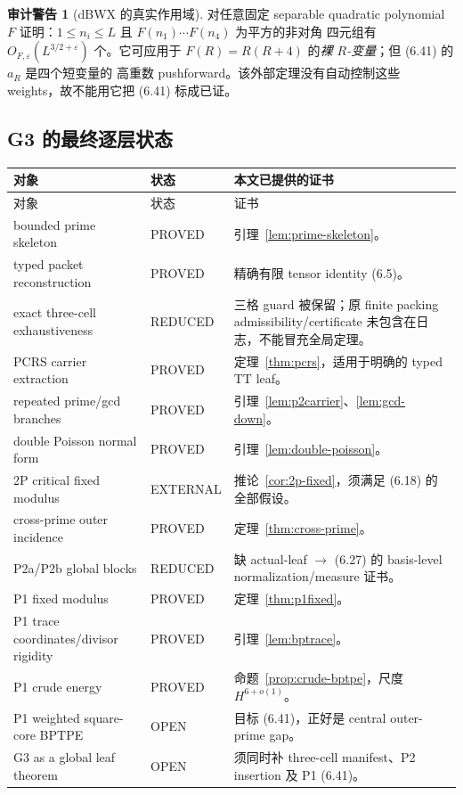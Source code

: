 \documentclass[11pt,a4paper]{ctexart}
\theoremstyle{definition}
\newtheorem{warning}[theorem]{审计警告}
\newcommand{\1}{\mathbf 1}
\newcommand{\OPEN}{\textcolor{red!70!black}{\textsf{OPEN}}}
\newcommand{\REDUCED}{\textcolor{orange!80!black}{\textsf{REDUCED}}}
\newcommand{\PROVED}{\textcolor{green!45!black}{\textsf{PROVED}}}
\newcommand{\EXTERNAL}{\textcolor{blue!70!black}{\textsf{EXTERNAL}}}
\begin{document}
\begin{warning}[dBWX 的真实作用域]
\cite[Proposition 6.1]{dBWX2026} 对任意固定 separable quadratic polynomial
$F$ 证明：$1\le n_i\le L$ 且 $F(n_1)\cdots F(n_4)$ 为平方的非对角
四元组有 $O_{F,\varepsilon}(L^{3/2+\varepsilon})$ 个。它可应用于
$F(R)=R(R+4)$ 的\emph{裸 $R$-变量}；但 (6.41) 的 $a_R$ 是四个短变量的
高重数 pushforward。该外部定理没有自动控制这些 weights，故不能用它把
(6.41) 标成已证。
\end{warning}

\subsection{G3 的最终逐层状态}

\begin{longtable}{p{}p{}p{}}
\toprule
对象&状态&本文已提供的证书\\ \midrule
\endfirsthead
\toprule 对象&状态&证书\\ \midrule\endhead
bounded prime skeleton&\PROVED&引理~\ref{lem:prime-skeleton}。\\
typed packet reconstruction&\PROVED&精确有限 tensor identity (6.5)。\\
exact three-cell exhaustiveness&\REDUCED&三格 guard 被保留；原 finite packing
admissibility/certificate 未包含在日志，不能冒充全局定理。\\
PCRS carrier extraction&\PROVED&定理~\ref{thm:pcrs}，适用于明确的 typed TT leaf。\\
repeated prime/gcd branches&\PROVED&引理~\ref{lem:p2carrier}、\ref{lem:gcd-down}。\\
double Poisson normal form&\PROVED&引理~\ref{lem:double-poisson}。\\
2P critical fixed modulus&\EXTERNAL&推论~\ref{cor:2p-fixed}，须满足 (6.18) 的全部假设。\\
cross-prime outer incidence&\PROVED&定理~\ref{thm:cross-prime}。\\
P2a/P2b global blocks&\REDUCED&缺 actual-leaf $\to$ (6.27) 的 basis-level
normalization/measure 证书。\\
P1 fixed modulus&\PROVED&定理~\ref{thm:p1fixed}。\\
P1 trace coordinates/divisor rigidity&\PROVED&引理~\ref{lem:bptrace}。\\
P1 crude energy&\PROVED&命题~\ref{prop:crude-bptpe}，尺度 $H^{6+o(1)}$。\\
P1 weighted square-core BPTPE&\OPEN&目标 (6.41)，正好是 central outer-prime gap。\\
G3 as a global leaf theorem&\OPEN&须同时补 three-cell manifest、P2 insertion
及 P1 (6.41)。\\
\bottomrule
\end{longtable}
\end{document}
